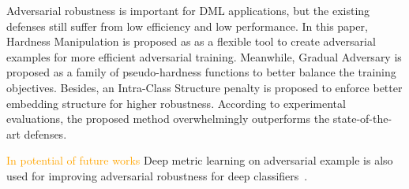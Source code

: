 \documentclass[10pt,twocolumn,letterpaper]{article}
\newcommand{\oo}[1]{\textcolor{orange}{#1}}
\begin{document}
Adversarial robustness is important for DML applications, but
the existing defenses still suffer from low efficiency and low
performance.
%
In this paper, 
Hardness Manipulation is proposed as as a flexible tool to create
adversarial examples for more efficient adversarial training.
%
Meanwhile, Gradual Adversary is proposed as a family of pseudo-hardness
functions to better balance the training objectives.
%
Besides, an Intra-Class Structure penalty is proposed to enforce better
embedding structure for higher robustness.
%
According to experimental evaluations, the proposed method overwhelmingly
outperforms the state-of-the-art defenses.

\oo{In potential of future works}
Deep metric learning on adversarial example is also used for improving
adversarial robustness for deep classifiers~\cite{mao2019metric}.

{\small


}


\end{document}
